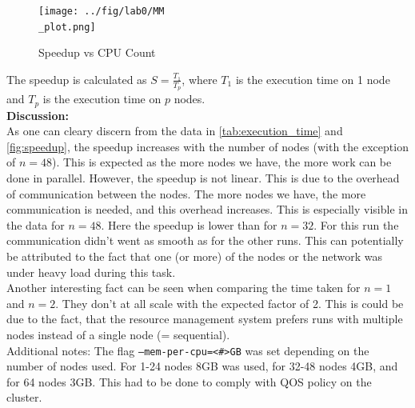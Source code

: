 \begin{figure}[H]
    \centering
    \texttt{[image: ../fig/lab0/MM\\\_plot.png]}
    \caption{Speedup vs CPU Count}
    \label{fig:speedup}
\end{figure}

 The speedup is calculated as $S = \frac{T_1}{T_p}$, where $T_1$ is the execution time on 1 node and $T_p$ is the execution time on $p$ nodes.\\

\textbf{Discussion:}\\
As one can cleary discern from the data in \autoref{tab:execution_time} and \autoref{fig:speedup}, the speedup increases with the number of nodes (with the exception of $n=48$). This is expected as the more nodes we have, the more work can be done in parallel. However, the speedup is not linear. This is due to the overhead of communication between the nodes. The more nodes we have, the more communication is needed, and this overhead increases. This is especially visible in the data for $n=48$. Here the speedup is lower than for $n=32$. For this run the communication didn't went as smooth as for the other runs. This can potentially be attributed to the fact that one (or more) of the nodes or the network was under heavy load during this task.\\
Another interesting fact can be seen when comparing the time taken for $n=1$ and $n=2$. They don't at all scale with the expected factor of 2. This is could be due to the fact, that the resource management system prefers runs with multiple nodes instead of a single node (= sequential). \\

Additional notes: The flag \texttt{--mem-per-cpu=<\#>GB} was set depending on the number of nodes used. For 1-24 nodes 8GB was used, for 32-48 nodes 4GB, and for 64 nodes 3GB. This had to be done to comply with QOS policy on the cluster. 










